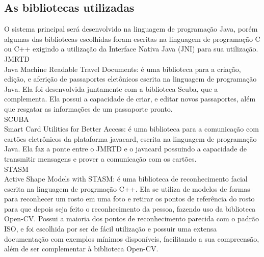 \documentclass{article}
\begin{document}
	\subsection{As bibliotecas utilizadas}
		\begin{justify}
			 
		\hspace{2cm}O sistema principal será desenvolvido na linguagem de programação Java, porém algumas das bibliotecas escolhidas foram escritas na linguagem de programação C ou C++ exigindo a utilização da Interface Nativa Java (JNI) para sua utilização.\\
		
        \hspace*{2cm}JMRTD\\
    \hspace*{2cm}Java Machine Readable Travel Documents: é uma biblioteca para a criação, edição, e aferição de passaportes eletônicos escrita na linguagem de programação Java. Ela foi desenvolvida juntamente com a biblioteca Scuba, que a complementa. Ela possui a capacidade de criar, e editar novos passaportes, além que resgatar as informações de um passaporte pronto. \\
        
		\hspace*{2cm}SCUBA\\
    \hspace*{2cm}Smart Card Utilities for Better Access: é uma biblioteca para a comunicação com cartões eletrônicos da plataforma javacard, escrita na linguagem de programação Java. Ela faz a ponte entre o JMRTD e o javacard possuindo a capacidade de transmitir mensagens e prover a comunicação com os cartões.\\
		
        \hspace*{2cm}STASM\\
    \hspace*{2cm}Active Shape Models with STASM: é uma biblioteca de reconhecimento facial escrita na linguagem de progrmação C++. Ela se utiliza de modelos de formas para reconhecer um rosto em uma foto e retirar os pontos de referência do rosto para que depois seja feito o reconhecimento da pessoa, fazendo uso da biblioteca Open-CV. Possui a maioria dos pontos de reconhecimento parecida com o padrão ISO\parencite{ISO}, e foi escolhida por ser de fácil utilização e possuir uma extensa documentação com exemplos mínimos disponíveis, facilitando a sua compreensão, além de ser complementar à biblioteca Open-CV.\\
		

\end{justify}
\end{document}
